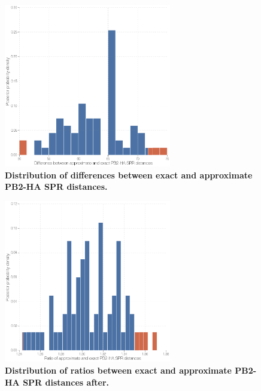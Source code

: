 \documentclass[11pt,oneside,letterpaper]{article}
\begin{document}
\begin{figure}
\centering  
\includegraphics[width=0.65\textwidth]  {supp_figures/InfB_supp_PB2-HA_hist.png}
\caption{\textbf{Distribution of differences between exact and approximate PB2-HA SPR distances.}}
\label{SPR_PB2-HA_difference}
\end{figure}

\begin{figure}
\centering  
\includegraphics[width=0.65\textwidth]  {supp_figures/InfB_supp_PB2-HA_hist2.png}
\caption{\textbf{Distribution of ratios between exact and approximate PB2-HA SPR distances after.}}
\label{SPR_PB2-HA_ratio}
\end{figure}
\end{document}
